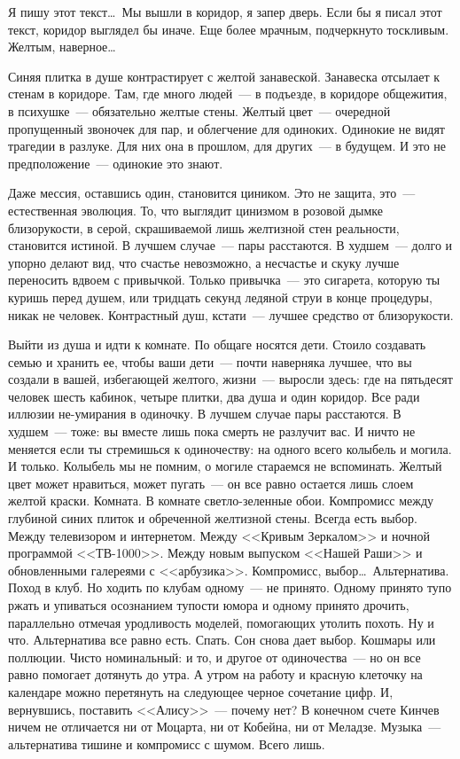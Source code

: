 Я пишу этот текст\ldots\ Мы вышли в коридор, я запер дверь. Если бы я писал 
этот текст, коридор выглядел бы иначе. Еще более мрачным, подчеркнуто тоскливым. 
Желтым, наверное\ldots

\newpage

Синяя плитка в душе контрастирует с желтой занавеской. Занавеска отсылает к 
стенам в коридоре. Там, где много людей~--- в подъезде, в коридоре общежития, в 
психушке~--- обязательно желтые стены. Желтый цвет~--- очередной пропущенный 
звоночек для пар, и облегчение для одиноких. Одинокие не видят трагедии в 
разлуке. Для них она в прошлом, для других~--- в будущем. И это не 
предположение~--- одинокие это знают.

Даже мессия, оставшись один, становится циником. Это не защита, это~--- 
естественная эволюция. То, что выглядит цинизмом в розовой дымке близорукости, 
в серой, скрашиваемой лишь желтизной стен реальности, становится истиной. В 
лучшем случае~--- пары расстаются. В худшем~--- долго и упорно делают вид, что счастье 
невозможно, а несчастье и скуку лучше переносить вдвоем с привычкой. Только 
привычка~--- это сигарета, которую ты куришь перед душем, или тридцать секунд 
ледяной струи в конце процедуры, никак не человек. Контрастный душ, кстати~--- 
лучшее средство от близорукости.

Выйти из душа и идти к комнате. По общаге носятся дети. Стоило создавать семью 
и хранить ее, чтобы ваши дети~--- почти наверняка лучшее, что вы создали в вашей, 
избегающей желтого, жизни~--- выросли здесь: где на пятьдесят человек шесть 
кабинок, четыре плитки, два душа и один коридор. Все ради иллюзии не-умирания в 
одиночку. В лучшем случае пары расстаются. В худшем~--- тоже: вы вместе лишь 
пока смерть не разлучит вас. И ничто не меняется если ты стремишься к одиночеству: 
на одного всего колыбель и могила. И только. Колыбель мы не помним, о могиле 
стараемся не вспоминать. Желтый цвет может нравиться, может пугать~--- он все 
равно остается лишь слоем желтой краски. Комната. В комнате светло-зеленные 
обои. Компромисс между глубиной синих плиток и обреченной желтизной стены. 
Всегда есть выбор. Между телевизором и интернетом. Между <<Кривым Зеркалом>> и 
ночной программой <<ТВ-1000>>. Между новым выпуском <<Нашей Раши>> и 
обновленными галереями с <<арбузика>>. Компромисс, выбор\ldots\ Альтернатива. Поход в клуб. 
Но ходить по клубам одному~--- не принято. Одному принято тупо ржать и упиваться 
осознанием тупости юмора и одному принято дрочить, параллельно отмечая 
уродливость моделей, помогающих утолить похоть. Ну и что. Альтернатива все 
равно есть. Спать. Сон снова дает выбор. Кошмары или поллюции. Чисто номинальный: и 
то, и другое от одиночества~--- но он все равно помогает дотянуть до утра. А 
утром на работу и красную клеточку на календаре можно перетянуть на следующее черное 
сочетание цифр. И, вернувшись, поставить <<Алису>>~--- почему нет? В конечном 
счете Кинчев ничем не отличается ни от Моцарта, ни от Кобейна, ни от Меладзе. 
Музыка~--- альтернатива тишине и компромисс с шумом. Всего лишь. 


